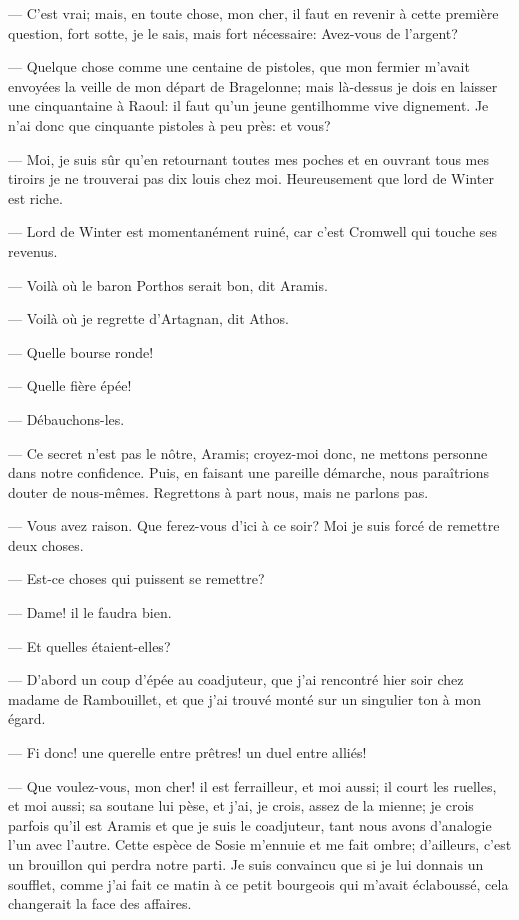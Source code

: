 — C'est vrai; mais, en toute chose, mon cher, il faut en revenir à cette première question, fort sotte, je le sais, mais fort nécessaire: Avez-vous de l'argent?

— Quelque chose comme une centaine de pistoles, que mon fermier m'avait envoyées la veille de mon départ de Bragelonne; mais là-dessus je dois en laisser une cinquantaine à Raoul: il faut qu'un jeune gentilhomme vive dignement. Je n'ai donc que cinquante pistoles à peu près: et vous?

— Moi, je suis sûr qu'en retournant toutes mes poches et en ouvrant tous mes tiroirs je ne trouverai pas dix louis chez moi. Heureusement que lord de Winter est riche.

— Lord de Winter est momentanément ruiné, car c'est Cromwell qui touche ses revenus.

— Voilà où le baron Porthos serait bon, dit Aramis.

— Voilà où je regrette d'Artagnan, dit Athos.

— Quelle bourse ronde!

— Quelle fière épée!

— Débauchons-les.

— Ce secret n'est pas le nôtre, Aramis; croyez-moi donc, ne mettons personne dans notre confidence. Puis, en faisant une pareille démarche, nous paraîtrions douter de nous-mêmes. Regrettons à part nous, mais ne parlons pas.

— Vous avez raison. Que ferez-vous d'ici à ce soir? Moi je suis forcé de remettre deux choses.

— Est-ce choses qui puissent se remettre?

— Dame! il le faudra bien.

— Et quelles étaient-elles?

— D'abord un coup d'épée au coadjuteur, que j'ai rencontré hier soir chez madame de Rambouillet, et que j'ai trouvé monté sur un singulier ton à mon égard.

— Fi donc! une querelle entre prêtres! un duel entre alliés!

— Que voulez-vous, mon cher! il est ferrailleur, et moi aussi; il court les ruelles, et moi aussi; sa soutane lui pèse, et j'ai, je crois, assez de la mienne; je crois parfois qu'il est Aramis et que je suis le coadjuteur, tant nous avons d'analogie l'un avec l'autre. Cette espèce de Sosie m'ennuie et me fait ombre; d'ailleurs, c'est un brouillon qui perdra notre parti. Je suis convaincu que si je lui donnais un soufflet, comme j'ai fait ce matin à ce petit bourgeois qui m'avait éclaboussé, cela changerait la face des affaires.

